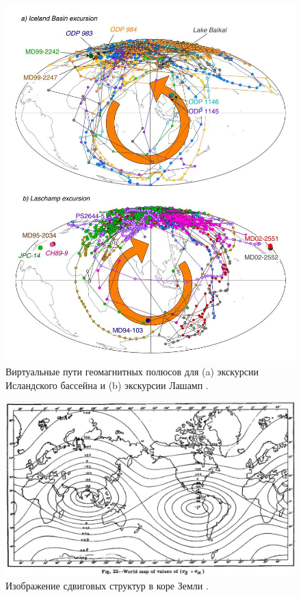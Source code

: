 \documentclass[10pt,twocolumn,letterpaper]{article}
\begin{document}
\begin{figure}[t]
\begin{center}
   \includegraphics[width=0.95\linewidth]{laj.jpg}
\end{center}
   \caption{Виртуальные пути геомагнитных полюсов для (a) экскурсии Исландского бассейна и (b) экскурсии Лашамп \cite{35}.}
\label{fig:7}
\label{fig:onecol}
\end{figure}

\begin{figure}[t]
\begin{center}
   \includegraphics[width=1\linewidth]{meinesz3.jpg}
\end{center}
   \caption{Изображение сдвиговых структур в коре Земли \cite{36}.}
\label{fig:8}
\label{fig:onecol}
\end{figure}
\end{document}

